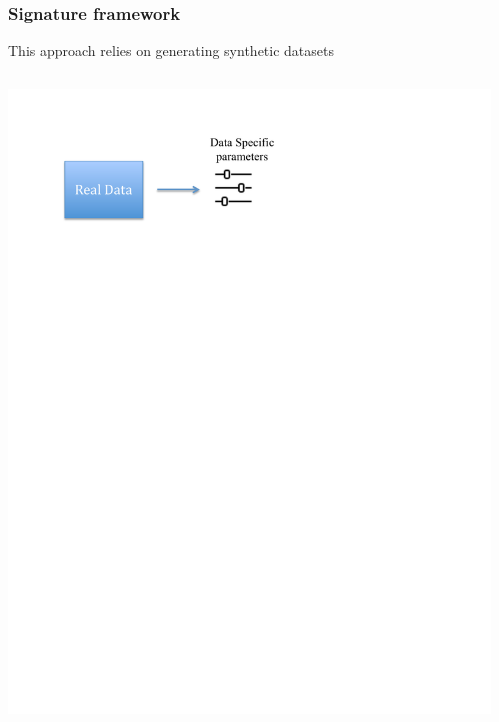 \documentclass{beamer}
\begin{document}
\begin{frame}\frametitle{Signature framework}
This approach relies on generating synthetic datasets
\begin{overprint}
		\begin{columns}
		\begin{column}{0.7\textwidth}
		\vspace{-0.8cm}
			\includegraphics[trim=1cm 10cm 1cm 1cm,scale=0.43]{images/Approach1.pdf}
		\end{column}
		\begin{column}{0.3\textwidth}
		\end{column}
		\end{columns}
 		\begin{columns}
		\begin{column}{0.7\textwidth}
		\vspace{-0.8cm}

\end{column}
\end{columns}
\end{overprint}
\end{frame}
\end{document}
